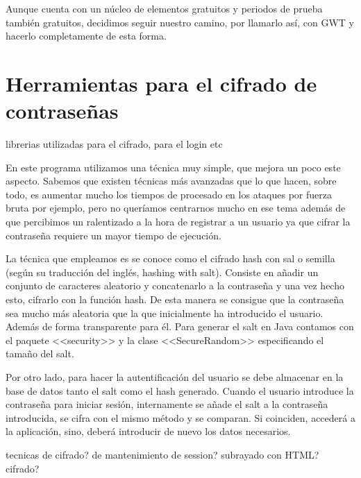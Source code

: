 Aunque cuenta con un núcleo de elementos gratuitos y periodos de prueba también gratuitos, decidimos seguir nuestro camino, por llamarlo así, con GWT y hacerlo completamente de esta forma.

\section{Herramientas para el cifrado de contraseñas}
librerias utilizadas para el cifrado, para el login etc


En este programa utilizamos una técnica muy simple, que mejora un poco este aspecto. Sabemos que existen técnicas más avanzadas que lo que hacen, sobre todo, es aumentar mucho los tiempos de procesado en los ataques por fuerza bruta por ejemplo, pero no queríamos centrarnos mucho en ese tema además de que percibimos un ralentizado a la hora de registrar a un usuario ya que cifrar la contraseña requiere un mayor tiempo de ejecución.



La técnica que empleamos es se conoce como el cifrado hash con sal o semilla (según su traducción del inglés, hashing with salt). Consiste en añadir un conjunto de caracteres aleatorio y concatenarlo a la contraseña y una vez hecho esto, cifrarlo con la función hash. De esta manera se consigue que la contraseña sea mucho más aleatoria que la que inicialmente ha introducido el usuario. Además de forma transparente para él. Para generar el salt en Java contamos con el paquete <<security>> y la clase <<SecureRandom>> especificando el tamaño del salt. 

Por otro lado, para hacer la autentificación del usuario se debe almacenar en la base de datos tanto el salt como el hash generado. Cuando el usuario introduce la contraseña para iniciar sesión, internamente se añade el salt a la contraseña introducida, se cifra con el mismo método y se comparan. Si coinciden, accederá a la aplicación, sino, deberá introducir de nuevo los datos necesarios.

tecnicas de cifrado? 
de mantenimiento de session?
subrayado con HTML?
cifrado?